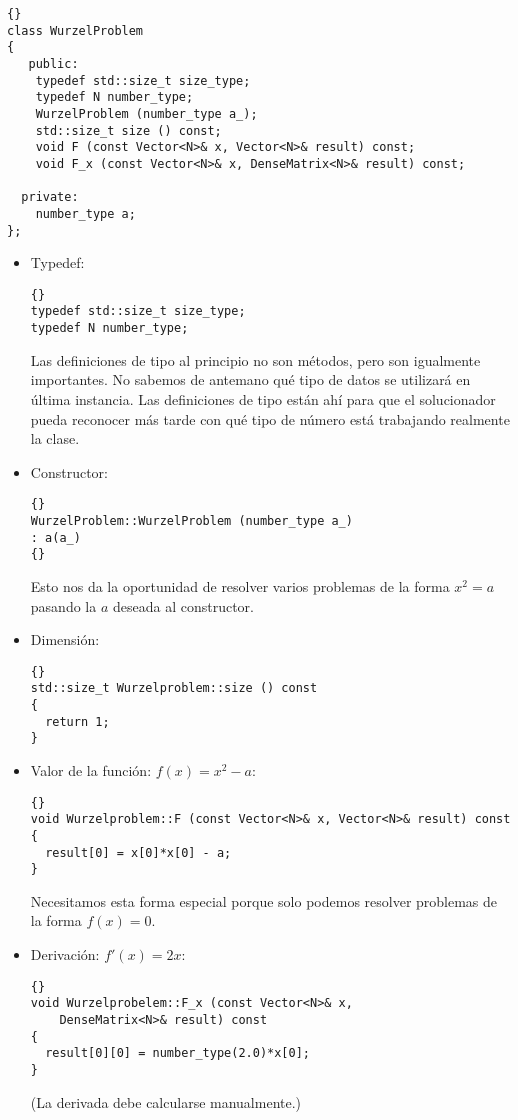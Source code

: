 \documentclass[a4paper,11pt]{article}
\theoremstyle{definition}
\begin{document}
{\footnotesize{\begin{lstlisting}{}
class WurzelProblem
{
   public:
    typedef std::size_t size_type;
    typedef N number_type;
    WurzelProblem (number_type a_);
    std::size_t size () const;
    void F (const Vector<N>& x, Vector<N>& result) const;
    void F_x (const Vector<N>& x, DenseMatrix<N>& result) const;

  private:
    number_type a;
};
\end{lstlisting}}}


\begin{itemize}
\item Typedef:

  {\footnotesize{\begin{lstlisting}{}
typedef std::size_t size_type;
typedef N number_type;
\end{lstlisting}}}

Las definiciones de tipo al principio no son métodos, pero son igualmente importantes. 
No sabemos de antemano qué tipo de datos se utilizará en última instancia. Las definiciones 
de tipo están ahí para que el solucionador pueda reconocer más tarde con qué tipo de 
número está trabajando realmente la clase.


\item Constructor:
  {\footnotesize{\begin{lstlisting}{}
WurzelProblem::WurzelProblem (number_type a_)
: a(a_)
{}
\end{lstlisting}}}

Esto nos da la oportunidad de resolver varios problemas de la forma 
$x^2=a$ pasando la $a$ deseada al constructor.

\item Dimensión:

  {\footnotesize{\begin{lstlisting}{}
std::size_t Wurzelproblem::size () const
{
  return 1;
}
\end{lstlisting}}}

\item Valor de la función: $f(x)=x^2-a$:

  {\footnotesize{\begin{lstlisting}{}
void Wurzelproblem::F (const Vector<N>& x, Vector<N>& result) const
{
  result[0] = x[0]*x[0] - a;
}
\end{lstlisting}}}

Necesitamos esta forma especial porque solo podemos resolver problemas de la forma $f (x) = 0$.


\item Derivación: $f'(x)=2x$:
  {\footnotesize{\begin{lstlisting}{}
void Wurzelprobelem::F_x (const Vector<N>& x,
    DenseMatrix<N>& result) const
{
  result[0][0] = number_type(2.0)*x[0];
}
\end{lstlisting}}}
(La derivada debe calcularse manualmente.)
\end{itemize}
\end{document}
